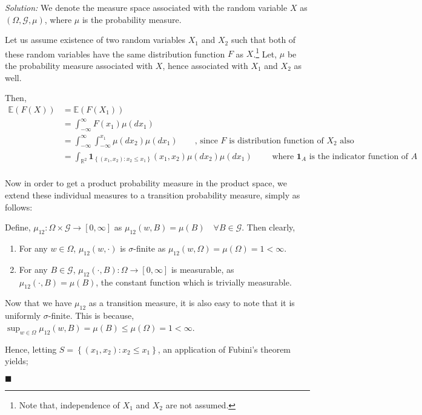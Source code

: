 \documentclass[12pt]{article}
\newcommand{\R}{\mathbb{R}}
\newcommand{\E}{\mathbb{E}}
\theoremstyle{definition}
\newenvironment{answer}{\textit{Solution: }\quad }{ \hfill $\blacksquare$}
\begin{document}
\begin{answer}
	We denote the measure space associated with the random variable $X$ as $(\Omega, \mathcal{G}, \mu)$, where $\mu$ is the probability measure.

	Let us assume existence of two random variables $X_1$ and $X_2$ such that both of these random variables have the same distribution function $F$ as $X$.\footnote{Note that, independence of $X_1$ and $X_2$ are not assumed.} Let, $\mu$ be the probability measure associated with $X$, hence associated with $X_1$ and $X_2$ as well.

	Then,
	\begin{align*}
		\E(F(X))
		& = \E(F(X_1))\\
		& = \int_{-\infty}^{\infty} F(x_1) \mu(dx_1)\\
		& = \int_{-\infty}^{\infty} \int_{-\infty}^{x_1} \mu(dx_2) \mu(dx_1) \qquad \text{, since } F \text{ is distribution function of } X_2 \text{ also}\\
		& = \int_{\R^2} \bm{1}_{\left\{ (x_1, x_2) : x_2 \leq x_1 \right\} }(x_1, x_2) \mu(dx_2) \mu(dx_1) \qquad \text{ where } \bm{1}_A \text{ is the indicator function of } A \\
	\end{align*}

	Now in order to get a product probability measure in the product space, we extend these individual measures to a transition probability measure, simply as follows:

	Define, $\mu_{12}: \Omega \times \mathcal{G} \rightarrow [0, \infty]$ as $\mu_{12}(w, B) = \mu(B) \quad \forall B \in \mathcal{G}$. Then clearly,

	\begin{enumerate}
		\item For any $w \in \Omega$, $\mu_{12}(w, \cdot)$ is $\sigma$-finite as $\mu_{12}(w, \Omega) = \mu(\Omega) = 1 < \infty$.
		\item For any $B \in \mathcal{G}$, $\mu_{12}(\cdot, B) : \Omega \rightarrow [0, \infty]$ is measurable, as $\mu_{12}(\cdot, B) = \mu(B)$, the constant function which is trivially measurable.
	\end{enumerate}

	Now that we have $\mu_{12}$ as a transition measure, it is also easy to note that it is uniformly $\sigma$-finite. This is because, $\sup_{w \in \Omega} \mu_{12}(w, B) = \mu(B) \leq \mu(\Omega) = 1 < \infty$. 

	Hence, letting $S = \left\{ (x_1, x_2) : x_2 \leq x_1 \right\}$, an application of Fubini's theorem yields;


\end{answer}
\end{document}
